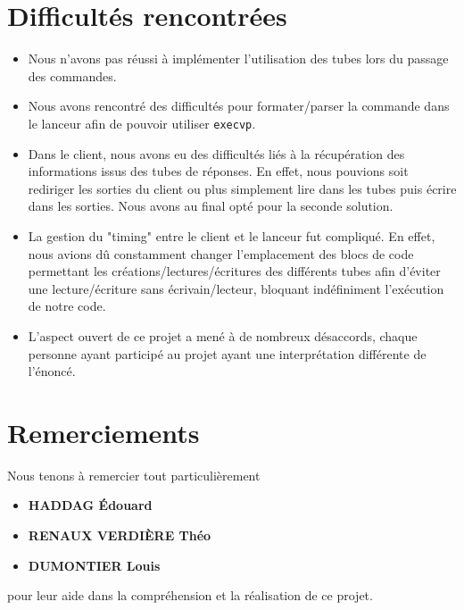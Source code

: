 \documentclass[12pt]{article}
\begin{document}
\section{Difficultés rencontrées}
\begin{itemize}
    \item Nous n'avons pas réussi à implémenter l'utilisation des tubes
          lors du passage
          des commandes.
    \item Nous avons rencontré des difficultés pour formater/parser la
          commande dans le lanceur
          afin de pouvoir utiliser \texttt{execvp}.
    \item Dans le client, nous avons eu des difficultés liés à la
          récupération des
          informations issus des tubes de réponses. En effet, nous pouvions soit
          rediriger les sorties du client ou plus simplement lire dans les tubes puis
          écrire dans les sorties. Nous avons au final opté pour la seconde solution.
    \item La gestion du "timing" entre le client et le lanceur fut
          compliqué. En effet, nous avions dû constamment changer l'emplacement des blocs
          de code permettant les créations/lectures/écritures des différents tubes afin
          d'éviter une lecture/écriture sans écrivain/lecteur, bloquant indéfiniment
          l'exécution de notre code.
    \item L'aspect ouvert de ce projet a mené à de nombreux désaccords,
          chaque personne ayant participé au projet ayant une interprétation différente
          de l'énoncé.
\end{itemize}

\section{Remerciements}
Nous tenons à remercier tout particulièrement \begin{itemize}
    \item \textbf{HADDAG
              Édouard}
    \item \textbf{RENAUX
              VERDIÈRE Théo}
    \item \textbf{DUMONTIER
              Louis}
\end{itemize} pour leur aide dans la compréhension et la réalisation de ce
projet.
\end{document}
